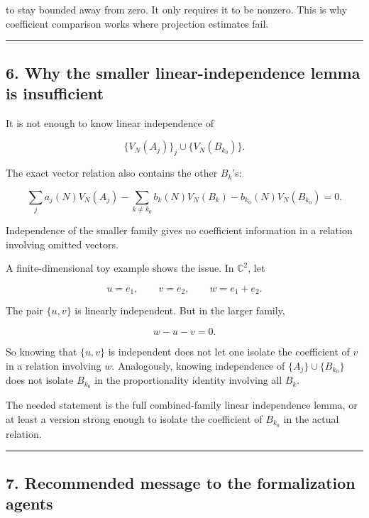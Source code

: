 \documentclass[
  11pt,
]{article}
\begin{document}
to stay bounded away from zero. It only requires it to be nonzero. This
is why coefficient comparison works where projection estimates fail.

\begin{center}\rule{0.5\linewidth}{0.5pt}\end{center}

\subsection{6. Why the smaller linear-independence lemma is
insufficient}\label{why-the-smaller-linear-independence-lemma-is-insufficient}

It is not enough to know linear independence of

\[
\{V_N(A_j)\}_j\cup\{V_N(B_{k_0})\}.
\]

The exact vector relation also contains the other \(B_k\)'s:

\[
\sum_j a_j(N)V_N(A_j)
-
\sum_{k\neq k_0} b_k(N)V_N(B_k)
-
b_{k_0}(N)V_N(B_{k_0})=0.
\]

Independence of the smaller family gives no coefficient information in a
relation involving omitted vectors.

A finite-dimensional toy example shows the issue. In \(\mathbb C^2\),
let

\[
u=e_1,\qquad v=e_2,\qquad w=e_1+e_2.
\]

The pair \(\{u,v\}\) is linearly independent. But in the larger family,

\[
w-u-v=0.
\]

So knowing that \(\{u,v\}\) is independent does not let one isolate the
coefficient of \(v\) in a relation involving \(w\). Analogously, knowing
independence of \(\{A_j\}\cup\{B_{k_0}\}\) does not isolate \(B_{k_0}\)
in the proportionality identity involving all \(B_k\).

The needed statement is the full combined-family linear independence
lemma, or at least a version strong enough to isolate the coefficient of
\(B_{k_0}\) in the actual relation.

\begin{center}\rule{0.5\linewidth}{0.5pt}\end{center}

\subsection{7. Recommended message to the formalization
agents}\label{recommended-message-to-the-formalization-agents}
\end{document}
